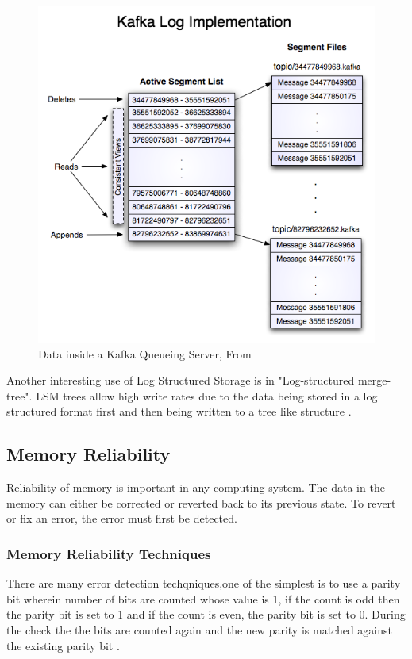 \documentclass[12pt,a4paper]{article}
\begin{document}
 \begin{figure}
 	\centering
 	\textbf{}\par\medskip
 	\includegraphics[scale=0.5]{5}
 	\caption{Data inside a Kafka Queueing Server, From \citep{kreps2011kafka}}
 	\label{fig:gdull05}
 \end{figure}



Another interesting use of Log Structured Storage is in "Log-structured merge-tree". LSM trees allow high write rates due to the data being stored in a log structured format first and then being written to a tree like structure \citep{o1996log}.

\subsection{Memory Reliability }

Reliability of memory is important in any computing system. The data in the memory can either be corrected or reverted back to its previous state. To revert or fix an error, the error must first be detected.

\subsubsection{Memory Reliability Techniques}
	There are many error detection techqniques,one of the simplest is to use a parity bit wherein number of bits are counted whose value is 1, if the count is odd then the parity bit is set to 1 and if the count is even, the parity bit is set to 0. During the check the the bits are counted again and the new parity is matched against the existing parity bit \citep{b1x}.\\
	
\end{document}
